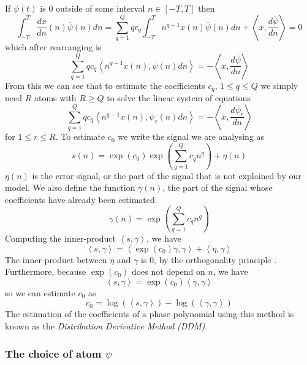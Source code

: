 \documentclass[letterpaper,12pt]{report}
\begin{document}
If $\psi(t)$ is 0 outside of some interval $n \in [-T,T]$ then
\[
    \int_{-T}^{T} \frac{dx}{dn}(n)\overline{\psi}(n) dn
    = \sum_{q=1}^{Q} q c_q \int_{-T}^{T} n^{q-1} x(n) \overline{\psi}(n) dn
    + \left\langle x, \frac{d\overline{\psi}}{dn} \right\rangle = 0
\]
which after rearranging is
\[ 
    \sum_{q=1}^{Q} q c_q 
    \left\langle n^{q-1} x(n) , \overline{\psi}(n) dn \right\rangle
    = -\left\langle x, \frac{d\overline{\psi}}{dn} \right\rangle
\]
From this we can see that to estimate the coefficients $c_q$, $ 1 \leq q \leq Q
$ we simply need $R$ atoms with $R \geq Q$ to solve the linear system of
equations
\begin{equation}
    \label{eq:ddmsyseq}
    \sum_{q=1}^{Q} q c_q 
    \left\langle n^{q-1} x(n) , \overline{\psi_{r}}(n) dn \right\rangle
    = -\left\langle x, \frac{d\overline{\psi_{r}}}{dn} \right\rangle
\end{equation}
for $1 \leq r \leq R$. To estimate $c_0$ we write the signal we are analysing as
\[
    s(n) = \exp(c_0) \exp \left( \sum_{q=1}^{Q} c_q n^{q} \right) + \eta (n)
\]
$\eta (n)$ is the error signal, or the part of the signal that is not explained
by our model. We also define the function $\gamma (n)$, the part of the signal
whose coefficients have already been estimated
\[
    \gamma(n) = \exp \left( \sum_{q=1}^{Q} c_q n^{q} \right)
\]
Computing the inner-product $\left\langle s , \gamma \right\rangle$, we have
\[
    \left\langle s , \gamma \right\rangle
    =
    \left\langle \exp(c_0) \gamma , \gamma \right\rangle + 
        \left\langle \eta , \gamma \right\rangle
\]
The inner-product between $\eta$ and $\gamma$ is $0$, by the orthogonality
principle \cite{kay1993fundamentals}. Furthermore, because $\exp(c_0)$ does not
depend on $n$, we have
\[
    \left\langle s , \gamma \right\rangle
    =
    \exp(c_0) \left\langle \gamma , \gamma \right\rangle
\]
so we can estimate $c_0$ as
\begin{equation}
    \label{eq:ddmestc0}
    c_0 = \log \left( \left\langle s , \gamma \right\rangle \right)
        - \log \left( \left\langle \gamma , \gamma \right\rangle \right)
\end{equation}
The estimation of the coefficients of a phase polynomial
using this method is known as the \textit{Distribution Derivative Method (DDM)}.

\subsubsection{The choice of atom $\psi$ \label{sec:optblackman}}
\end{document}
